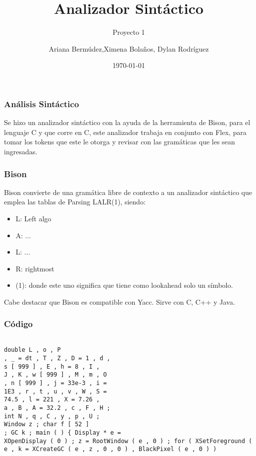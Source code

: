 \documentclass{beamer}
\title{Analizador Sint\'actico}
\subtitle{Proyecto 1}
\author{Ariana Berm\'udez,Ximena Bola\~nos, Dylan Rodr\'iguez}
\institute{Instituto Tecnol\'ogico de Costa Rica}
\date{\today}
\begin{document}
\begin{frame}
 \titlepage 
 \end{frame}\begin{frame}
 \frametitle{An\'alisis Sint\'actico}
  Se hizo un analizador sint\'actico con la ayuda de la herramienta de Bison, para el lenguaje C y que corre en C, este analizador trabaja en conjunto con Flex, para tomar los tokens que este le otorga y revisar con las gram\'aticas que les sean ingresadas. \end{frame}\begin{frame}
 \frametitle{Bison}
 Bison convierte de una gram\'atica libre de contexto a un analizador sint\'actico que emplea las tablas de Parsing LALR(1), siendo: \begin{itemize} \item L: Left algo \item A: ... \item L: ... \item R: rightmost \item (1): donde este uno significa que tiene como lookahead solo un s\'imbolo. \end{itemize} Cabe destacar que Bison es compatible con Yacc. Sirve con C, C++ y Java. \end{frame}\begin{frame}[fragile]
\frametitle{C\'odigo}
\begin{verbatim}

double L , o , P 
, _ = dt , T , Z , D = 1 , d , 
s [ 999 ] , E , h = 8 , I , 
J , K , w [ 999 ] , M , m , O 
, n [ 999 ] , j = 33e-3 , i = 
1E3 , r , t , u , v , W , S = 
74.5 , l = 221 , X = 7.26 , 
a , B , A = 32.2 , c , F , H ; 
int N , q , C , y , p , U ; 
Window z ; char f [ 52 ] 
; GC k ; main ( ) { Display * e = 
XOpenDisplay ( 0 ) ; z = RootWindow ( e , 0 ) ; for ( XSetForeground ( e , k = XCreateGC ( e , z , 0 , 0 ) , BlackPixel ( e , 0 ) ) 
\end{verbatim}
\end{frame}
\end{document}
